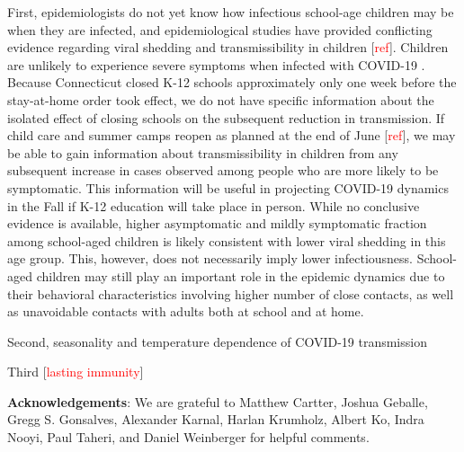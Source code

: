 \documentclass[11pt]{article}
\newcommand{\comment}[1]{[\textcolor{red}{#1}]}
\begin{document}
First, epidemiologists do not yet know how infectious school-age children may be when they are infected, and epidemiological studies have provided conflicting evidence regarding viral shedding and transmissibility in children \comment{ref}.  Children are unlikely to experience severe symptoms when infected with COVID-19 \citep{verity2020estimates}.  Because Connecticut closed K-12 schools approximately only one week before the stay-at-home order took effect, we do not have specific information about the isolated effect of closing schools on the subsequent reduction in transmission.  If child care and summer camps reopen as planned at the end of June \comment{ref}, we may be able to gain information about transmissibility in children from any subsequent increase in cases observed among people who are more likely to be symptomatic.  This information will be useful in projecting COVID-19 dynamics in the Fall if K-12 education will take place in person.  While no conclusive evidence is available, higher asymptomatic and mildly symptomatic fraction among school-aged children is likely consistent with lower viral shedding in this age group. This, however, does not necessarily imply lower infectiousness. School-aged children may still play an important role in the epidemic dynamics due to their behavioral characteristics involving higher number of close contacts, as well as unavoidable contacts with adults both at school and at home. 

Second, seasonality and temperature dependence of COVID-19 transmission 

Third \comment{lasting immunity} 





\textbf{Acknowledgements}: We are grateful to
Matthew Cartter,
Joshua Geballe,
Gregg S. Gonsalves,
Alexander Karnal,
Harlan Krumholz,
Albert Ko, 
Indra Nooyi,
Paul Taheri, 
and
Daniel Weinberger
for helpful comments. 





\end{document}
